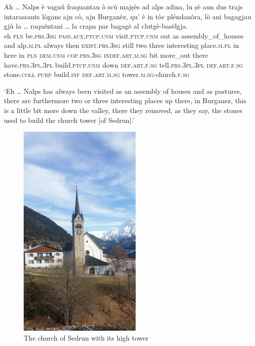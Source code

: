 \begin{linenumbers}
\gll Ah … Nalps è vagnú fraquantau ò scù majṣès ad alps adina, lu ṣè aun dus trajs intarassants lògans ajn cò, ajn Burganèz, qu' è in tòc pléndanòra, lò ani bagagjau gjù la … raquéntani … la crapa par bagagè al clutgè-basèlgja.\\
eh {}  \textsc{pln}  be.\textsc{prs.3sg} \textsc{pass.aux.ptcp.unm} visit.\textsc{ptcp.unm} out as assembly\_of\_houses and alp.\textsc{m.pl} always then \textsc{exist.prs.3sg} still two three interesting place.\textsc{m.pl} in here in \textsc{pln} \textsc{dem.unm} \textsc{cop.prs.3sg} \textsc{indef.art.m.sg} bit more\_out there have.\textsc{prs.3pl.3pl} build.\textsc{ptcp.unm} down \textsc{def.art.f.sg} {} tell.\textsc{prs.3pl.3pl} {} \textsc{def.art.f.sg} stone.\textsc{coll} \textsc{purp} build.\textsc{inf}  \textsc{def.art.m.sg} tower.\textsc{m.sg}-church.\textsc{f.sg}  \\
\end{linenumbers}
\medskip
\glt `Eh … Nalps has always been visited as an assembly of houses and as pastures, there are furthermore two or three interesting places up there, in Burganez, this is a little bit more down the valley, there they removed, as they say, the stones used to build the church tower [of Sedrun].'
\medskip

\begin{figure}
	\includegraphics[angle=360,width=
	60mm]{figures/Baselgia da Sedrun.jpg}
	\caption{The church of Sedrun with its high tower}
\end{figure}


